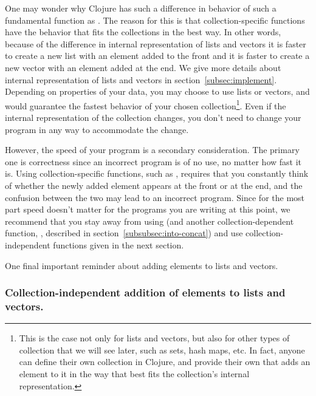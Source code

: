 One may wonder why Clojure has such a difference in behavior of such a fundamental function as . The reason for this is that collection-specific functions have the behavior that fits the collections  in the best way. In other words, because of the difference in internal representation of lists and vectors it is faster to create a new list with an element added to the front and it is faster to create a new vector with an element added at the end. We give more details about internal representation of lists and vectors in section~\ref{subsec:implement}. Depending on properties of your data, you may choose to use lists or vectors, and  would guarantee the fastest behavior of your chosen collection\footnote{This is the case not only for lists and vectors, but also for other types of collection that we will see later, such as sets, hash maps, etc. In fact, anyone can define their own collection in Clojure, and provide their own  that adds an element to it in the way that best fits the collection's internal representation.}. Even if the internal representation of the collection changes, you don't need to change your program in any way to accommodate the change. 

However, the speed of your program is a secondary consideration. The primary one is correctness since an incorrect program is of no use, no matter how fast it is. Using collection-specific functions, such as , requires that you constantly think of whether the newly added element appears at the front or at the end, and the confusion between the two may lead to an incorrect program. Since for the most part speed doesn't matter for the programs you are writing at this point, we recommend that you stay away from using  (and another collection-dependent function, , described in section~\ref{subsubsec:into-concat}) and use collection-independent functions given in the next section. 

One final important reminder about adding elements to lists and vectors. 


\subsubsection{Collection-independent addition of elements to lists and vectors. }\label{subsubsec:add-first-last}

